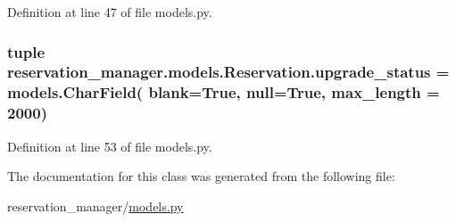 Definition at line 47 of file models.\-py.

\hypertarget{classreservation__manager_1_1models_1_1Reservation_a7c49fa9a9dffa54479e28154f87c0a7d}{
\subsubsection[{upgrade\-\_\-status}]{\setlength{\rightskip}{0pt plus 5cm}tuple reservation\-\_\-manager.\-models.\-Reservation.\-upgrade\-\_\-status = models.\-Char\-Field( blank=True, null=True, max\-\_\-length = 2000)\hspace{0.3cm}{\ttfamily [static]}}}\label{classreservation__manager_1_1models_1_1Reservation_a7c49fa9a9dffa54479e28154f87c0a7d}


Definition at line 53 of file models.\-py.



The documentation for this class was generated from the following file\-:\begin{DoxyCompactItemize}
\item 
reservation\-\_\-manager/\hyperlink{reservation__manager_2models_8py}{models.\-py}\end{DoxyCompactItemize}
